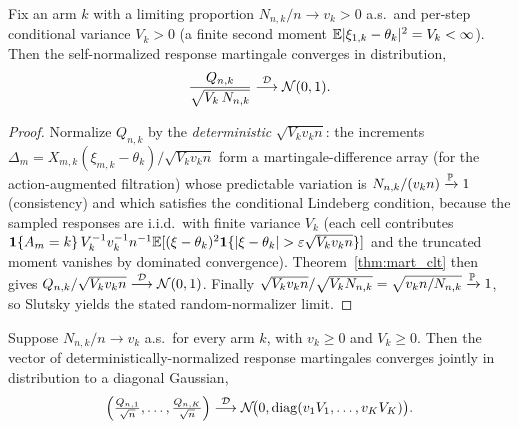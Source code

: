 \begin{lemma}\label{lem:mart_clt_selfnorm_arm}
\leanok
{}
Fix an arm $k$ with a limiting proportion $N_{n,k}/n\to v_k>0$ a.s.\ and per-step conditional
variance $V_k>0$ (a finite second moment $\mathbb{E}|\xi_{1,k}-\theta_k|^2 = V_k<\infty$). Then the
self-normalized response martingale converges in distribution,
\[
  \frac{Q_{n,k}}{\sqrt{V_k\,N_{n,k}}} \overset{\mathcal{D}}{\longrightarrow} \mathcal N(0,1).
\]
\end{lemma}

\begin{proof}\leanok
{}
Normalize $Q_{n,k}$ by the \emph{deterministic} $\sqrt{V_k v_k n}$: the increments
$\Delta_{m}=X_{m,k}(\xi_{m,k}-\theta_k)/\sqrt{V_k v_k n}$ form a martingale-difference array (for the
action-augmented filtration) whose predictable variation is $N_{n,k}/(v_k n)\xrightarrow{\mathbb{P}}1$
(consistency) and which satisfies the conditional Lindeberg condition, because the sampled responses
are i.i.d.\ with finite variance $V_k$ (each cell contributes
$\indic\{A_m=k\}\,V_k^{-1}v_k^{-1}n^{-1}\E[(\xi-\theta_k)^2\indic\{|\xi-\theta_k|>\varepsilon\sqrt{V_k v_k n}\}]$
and the truncated moment vanishes by dominated convergence). Theorem~\ref{thm:mart_clt} then gives
$Q_{n,k}/\sqrt{V_k v_k n}\overset{\mathcal{D}}{\longrightarrow}\mathcal N(0,1)$. Finally
$\sqrt{V_k v_k n}/\sqrt{V_k N_{n,k}}=\sqrt{v_k n/N_{n,k}}\xrightarrow{\mathbb{P}}1$, so Slutsky yields the
stated random-normalizer limit.
\end{proof}

\begin{lemma}\label{lem:mart_clt_joint}
\leanok
{}
Suppose $N_{n,k}/n\to v_k$ a.s.\ for every arm $k$, with $v_k\ge0$ and $V_k\ge0$. Then the vector of
deterministically-normalized response martingales converges jointly in distribution to a diagonal
Gaussian,
\[
  \Big(\tfrac{Q_{n,1}}{\sqrt n},\dots,\tfrac{Q_{n,K}}{\sqrt n}\Big)
    \overset{\mathcal{D}}{\longrightarrow} \mathcal N\!\big(0, \mathrm{diag}(v_1V_1,\dots,v_KV_K)\big).
\]
\end{lemma}

